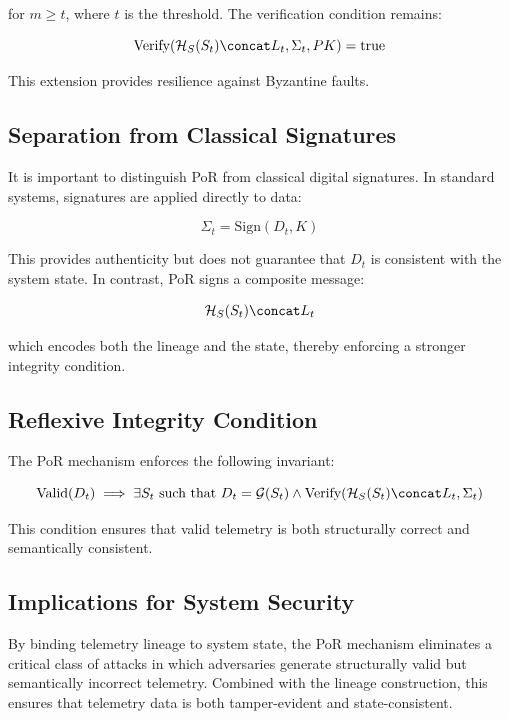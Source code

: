 for $m \geq t$, where $t$ is the threshold. The verification condition remains:

\begin{equation}
\text{Verify}(\mathcal{H}_S(S_t) \concat L_t, \Sigma_t, PK) = \text{true}
\end{equation}

This extension provides resilience against Byzantine faults.

\subsection{Separation from Classical Signatures}

It is important to distinguish PoR from classical digital signatures. In standard systems, signatures are applied directly to data:

\begin{equation}
\Sigma_t = \text{Sign}(D_t, K)
\end{equation}

This provides authenticity but does not guarantee that $D_t$ is consistent with the system state. In contrast, PoR signs a composite message:

\begin{equation}
\mathcal{H}_S(S_t) \concat L_t
\end{equation}

which encodes both the lineage and the state, thereby enforcing a stronger integrity condition.

\subsection{Reflexive Integrity Condition}

The PoR mechanism enforces the following invariant:

\begin{equation}
\text{Valid}(D_t) \implies \exists S_t \text{ such that } D_t = \mathcal{G}(S_t) \land \text{Verify}(\mathcal{H}_S(S_t) \concat L_t, \Sigma_t)
\end{equation}

This condition ensures that valid telemetry is both structurally correct and semantically consistent.

\subsection{Implications for System Security}

By binding telemetry lineage to system state, the PoR mechanism eliminates a critical class of attacks in which adversaries generate structurally valid but semantically incorrect telemetry. Combined with the lineage construction, this ensures that telemetry data is both tamper-evident and state-consistent.

